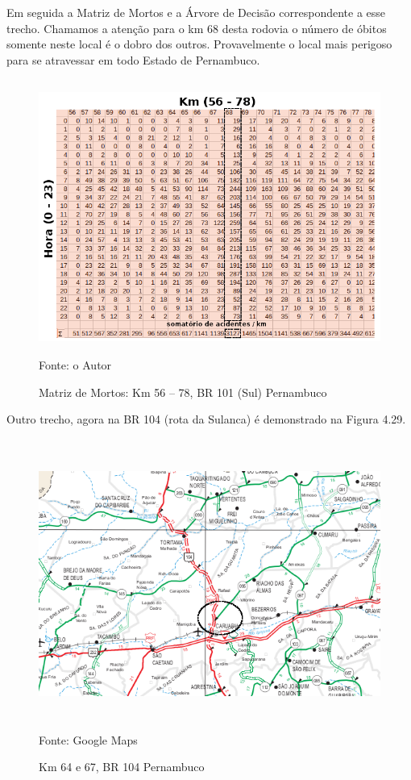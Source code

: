 \vspace{7mm}

Em seguida a Matriz de Mortos e a Árvore de Decisão correspondente a esse trecho. Chamamos a atenção para o km 68 desta rodovia o número de óbitos somente neste local é o dobro dos outros. Provavelmente o local mais perigoso para se atravessar em todo Estado de Pernambuco.

\begin{figure}[htbp!]
	\centering
	\caption{Matriz de Mortos: Km 56 -- 78, BR 101 (Sul) Pernambuco}
	\label{fig:MatrizMortos2d-101}
	\includegraphics[width=120mm, height=90mm]{Figuras/Resultados/MM2d101}\\
	\tiny Fonte: o Autor
\end{figure}

\pagebreak


Outro trecho, agora na BR 104 (rota da Sulanca) é demonstrado na Figura 4.29.
\begin{figure}[htbp!]
	\centering
	\caption{Km 64 e 67, BR 104 Pernambuco}
	\label{fig:Km70BR101}
	\includegraphics[width=150mm, height=95mm]{Figuras/Resultados/CaruaruRegiao}\\
	\tiny Fonte: Google Maps
\end{figure}

